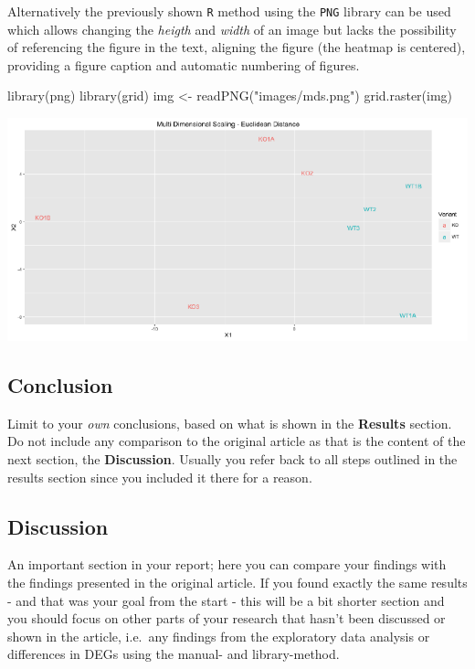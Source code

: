 \newpage

Alternatively the previously shown \texttt{R} method using the
\texttt{PNG} library can be used which allows changing the \emph{heigth}
and \emph{width} of an image but lacks the possibility of referencing
the figure in the text, aligning the figure (the heatmap is centered),
providing a figure caption and automatic numbering of figures.

\begin{Schunk}
\begin{Sinput}
library(png)
library(grid)
img <- readPNG("images/mds.png")
grid.raster(img)
\end{Sinput}

\includegraphics{report-template_files/figure-latex/MDS-Figure-1} \end{Schunk}

\hypertarget{conclusion}{%
\subsection{Conclusion}\label{conclusion}}

Limit to your \emph{own} conclusions, based on what is shown in the
\textbf{Results} section. Do not include any comparison to the original
article as that is the content of the next section, the
\textbf{Discussion}. Usually you refer back to all steps outlined in the
results section since you included it there for a reason.

\hypertarget{discussion}{%
\subsection{Discussion}\label{discussion}}

An important section in your report; here you can compare your findings
with the findings presented in the original article. If you found
exactly the same results - and that was your goal from the start - this
will be a bit shorter section and you should focus on other parts of
your research that hasn't been discussed or shown in the article,
i.e.~any findings from the exploratory data analysis or differences in
DEGs using the manual- and library-method.

